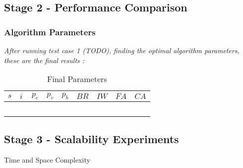 \subsection{Stage 2 - Performance Comparison}

\subsubsection{Algorithm Parameters}
\emph{\color{red} After running test case 1 (TODO), finding the optimal algorithm parameters, these are the final results :}

\begin{table}[H]
	\centering
    \begin{tabular}{|l|l|l|l|l|l|l|l|l|}
 	\hline
 	$s$ & $i$ & $p_{e}$ & $p_{v}$ & $p_{b}$ & $BR$  & $IW$ & $FA$ & $CA$  \\
 	\hline
    ~ & ~ & ~ & ~ & ~ & ~ & ~ & ~  & ~  \\
	\hline
    \end{tabular}
    \caption {Final Parameters}
    \label{table:finalParameters}
	\end{table}

\subsection{Stage 3 -  Scalability Experiments}
Time and Space Complexity

